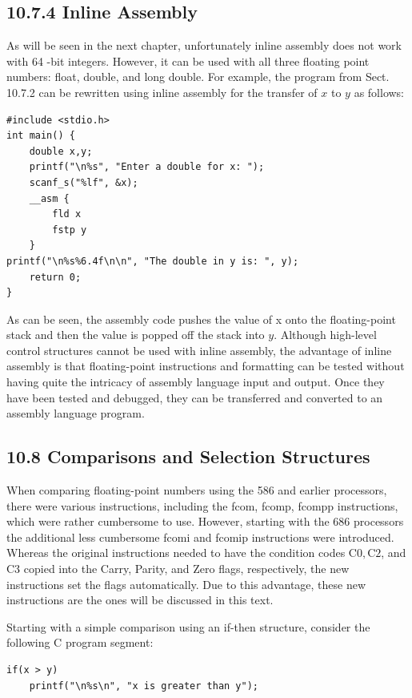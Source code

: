 \documentclass[10pt]{article}
\begin{document}
\subsection*{10.7.4 Inline Assembly}
As will be seen in the next chapter, unfortunately inline assembly does not work with 64 -bit integers. However, it can be used with all three floating point numbers: float, double, and long double. For example, the program from Sect. 10.7.2 can be rewritten using inline assembly for the transfer of $x$ to $y$ as follows:

\begin{verbatim}
#include <stdio.h>
int main() {
    double x,y;
    printf("\n%s", "Enter a double for x: ");
    scanf_s("%lf", &x);
    __asm {
        fld x
        fstp y
    }
printf("\n%s%6.4f\n\n", "The double in y is: ", y);
    return 0;
}
\end{verbatim}

As can be seen, the assembly code pushes the value of x onto the floating-point stack and then the value is popped off the stack into $y$. Although high-level control structures cannot be used with inline assembly, the advantage of inline assembly is that floating-point instructions and formatting can be tested without having quite the intricacy of assembly language input and output. Once they have been tested and debugged, they can be transferred and converted to an assembly language program.

\subsection*{10.8 Comparisons and Selection Structures}
When comparing floating-point numbers using the 586 and earlier processors, there were various instructions, including the fcom, fcomp, fcompp instructions, which were rather cumbersome to use. However, starting with the 686 processors the additional less cumbersome fcomi and fcomip instructions were introduced. Whereas the original instructions needed to have the condition codes $\mathrm{C} 0, \mathrm{C} 2$, and C3 copied into the Carry, Parity, and Zero flags, respectively, the new instructions set the flags automatically. Due to this advantage, these new instructions are the ones will be discussed in this text.

Starting with a simple comparison using an if-then structure, consider the following C program segment:

\begin{verbatim}
if(x > y)
    printf("\n%s\n", "x is greater than y");
\end{verbatim}
\end{document}
